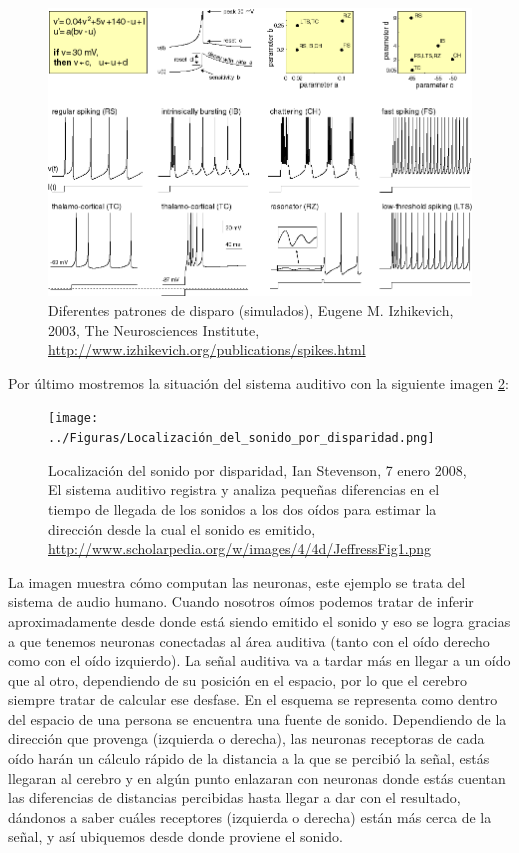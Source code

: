 \begin{figure}[h]
 \centering
 \includegraphics[scale=0.5]{../Figuras/Simple_Model_of_Spiking_Neurons.png}
 \caption{Diferentes patrones de disparo (simulados), Eugene M. Izhikevich, 2003, The Neurosciences Institute, \url{http://www.izhikevich.org/publications/spikes.html}}
 \label{fig:simpleModel}
\end{figure}

Por último mostremos la situación del sistema auditivo con la siguiente imagen \ref{fig:sonidoDisp}:

\begin{figure}[H]
 \centering
 \texttt{[image: ../Figuras/Localización\_del\_sonido\_por\_disparidad.png]}
 \caption{Localización del sonido por disparidad, Ian Stevenson, 7 enero 2008, El sistema auditivo registra y analiza pequeñas diferencias en el tiempo de llegada de los sonidos a los dos oídos para estimar la dirección desde la cual el sonido es emitido, \url{http://www.scholarpedia.org/w/images/4/4d/JeffressFig1.png}}
 \label{fig:sonidoDisp}
\end{figure}

La imagen muestra cómo computan las neuronas, este ejemplo se trata del sistema de audio humano. Cuando nosotros oímos podemos tratar de inferir aproximadamente desde donde está siendo emitido el sonido y eso se logra gracias a que tenemos neuronas conectadas al área auditiva (tanto con el oído derecho como con el oído izquierdo). La señal auditiva va a tardar más en llegar a un oído que al otro, dependiendo de su posición en el espacio, por lo que el cerebro siempre tratar de calcular ese desfase.  
En el esquema se representa como dentro del espacio de una persona se encuentra una fuente de sonido. Dependiendo de la dirección que provenga (izquierda o derecha), las neuronas receptoras de cada oído harán un cálculo rápido de la distancia a la que se percibió la señal, estás llegaran al cerebro y en algún punto enlazaran con neuronas donde estás cuentan las diferencias de distancias percibidas hasta llegar a dar con el resultado, dándonos a saber cuáles receptores (izquierda o derecha) están más cerca de la señal, y así ubiquemos desde donde proviene el sonido.




